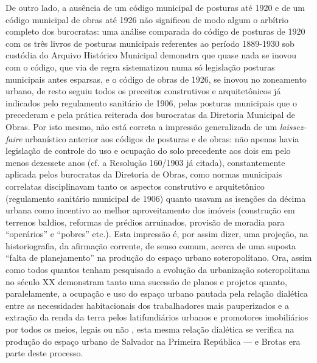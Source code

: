 De outro lado, a ausência de um código municipal de posturas até 1920 e de um código municipal de obras até 1926 não significou de modo algum o arbítrio completo dos burocratas: uma análise comparada do código de posturas de 1920 com os três livros de posturas municipais referentes ao período 1889-1930 sob custódia do Arquivo Histórico Municipal demonstra que quase nada se inovou com o código, que via de regra sistematizou numa só legislação posturas municipais antes esparsas, e o código de obras de 1926, se inovou no zoneamento urbano, de resto seguiu todos os preceitos construtivos e arquitetônicos já indicados pelo regulamento sanitário de 1906, pelas posturas municipais que o precederam e pela prática reiterada dos burocratas da Diretoria Municipal de Obras. Por isto mesmo, não está correta a impressão generalizada de um \textit{laissez-faire} urbanístico anterior aos códigos de posturas e de obras: não apenas havia legislação de controle do uso e ocupação do solo precedente aos dois em pelo menos dezessete anos (cf. a Resolução 160/1903 já citada), constantemente aplicada pelos burocratas da Diretoria de Obras, como normas municipais correlatas disciplinavam tanto os aspectos construtivo e arquitetônico (regulamento sanitário municipal de 1906) quanto usavam as isenções da décima urbana como incentivo ao melhor aproveitamento dos imóveis (construção em terrenos baldios, reformas de prédios arruinados, provisão de moradia para ``operários'' e ``pobres'' etc.). Esta impressão é, por assim dizer, uma projeção, na historiografia, da afirmação corrente, de senso comum, acerca de uma suposta ``falta de planejamento'' na produção do espaço urbano soteropolitano. Ora, assim como todos quantos tenham pesquisado a evolução da urbanização soteropolitana no século XX demonstram tanto uma sucessão de planos e projetos quanto, paralelamente, a ocupação e uso do espaço urbano pautada pela relação dialética entre as necessidades habitacionais dos trabalhadores mais pauperizados e a extração da renda da terra pelos latifundiários urbanos e promotores imobiliários por todos os meios, legais ou não \cite{BRANDAO1978, BRANDAO1978a, BRANDAO1980, CARVALHO1974, GORDILHO-SOUZA2008, SAMPAIO1999, VASCONCELLOS1974, VASCONCELOS2002}, esta mesma relação dialética se verifica na produção do espaço urbano de Salvador na Primeira República --- e Brotas era parte deste processo. 

